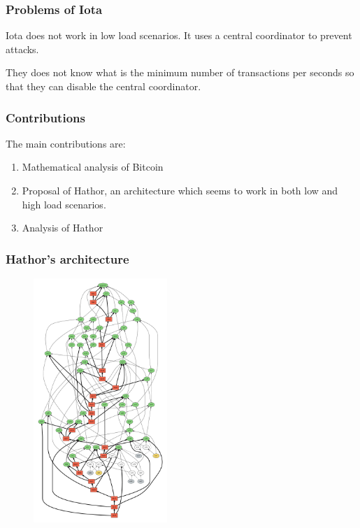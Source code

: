 \documentclass{beamer}
\begin{document}
\begin{frame}
\frametitle{Problems of Iota}

Iota does not work in low load scenarios. It uses a central coordinator to prevent attacks.

They does not know what is the minimum number of transactions per seconds so that they can disable the central coordinator.

\end{frame}


\begin{frame}
\frametitle{Contributions}

The main contributions are:
\begin{enumerate}[i]
\item Mathematical analysis of Bitcoin
\item Proposal of Hathor, \small{an architecture which seems to work in both low and high load scenarios.}
\item Analysis of Hathor
\end{enumerate}
\end{frame}


\begin{frame}
\frametitle{Hathor's architecture}

\begin{figure}
\centering\includegraphics[width=0.45\textwidth]{./images01/sim/hathor-2.pdf}
\end{figure}

\end{frame}
\end{document}
